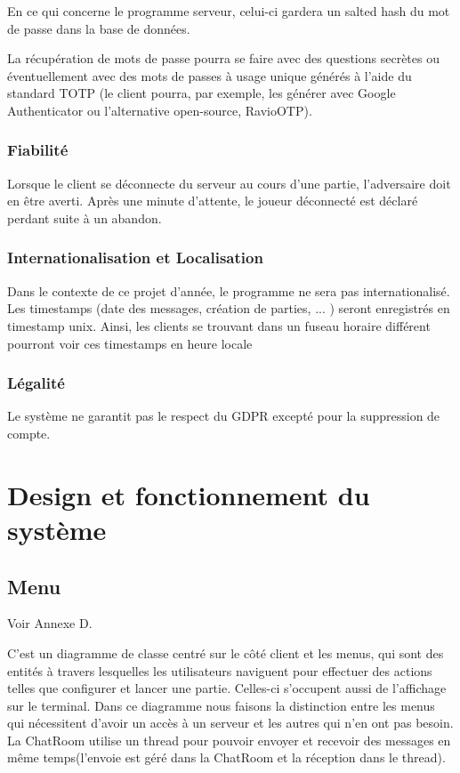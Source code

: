 \documentclass[french, utf8]{article}
\begin{document}
En ce qui concerne le programme serveur, celui-ci gardera un salted hash du mot de passe dans la base de données.

La récupération de mots de passe pourra se faire avec des questions secrètes ou éventuellement avec des mots de passes à usage unique générés à l'aide du standard TOTP (le client pourra, par exemple, les générer avec Google Authenticator ou l'alternative open-source, RavioOTP).


\subsubsection{Fiabilité}

Lorsque le client se déconnecte du serveur au cours d'une partie, l'adversaire doit en être averti.
Après une minute d'attente, le joueur déconnecté est déclaré perdant suite à un abandon.

\subsubsection{Internationalisation et Localisation}

Dans le contexte de ce projet d'année, le programme ne sera pas internationalisé.
Les timestamps (date des messages, création de parties, ... ) seront enregistrés en timestamp unix. Ainsi, les clients se trouvant dans un fuseau horaire différent pourront voir ces timestamps en heure locale


\subsubsection{Légalité}
Le système ne garantit pas le respect du GDPR excepté pour la suppression de compte.


\section{Design et fonctionnement du système}

\subsection{Menu}

Voir Annexe D.

C'est un diagramme de classe centré sur le côté client et les menus, qui sont des entités à travers lesquelles les utilisateurs naviguent pour effectuer des actions telles que configurer et lancer une partie. Celles-ci s'occupent aussi de l'affichage sur le terminal. \newline
Dans ce diagramme nous faisons la distinction entre les menus qui nécessitent d'avoir un accès à un serveur et les autres qui n'en ont pas besoin. \newline
La ChatRoom utilise un thread pour pouvoir envoyer et recevoir des messages en même temps(l'envoie est géré dans la ChatRoom et la réception dans le thread).
\end{document}
